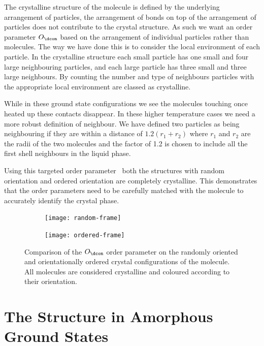 The crystalline structure of the \dcon molecule is defined by the underlying arrangement of particles, the arrangement of bonds on top of the arrangement of particles does not contribute to the crystal structure. As such we want an order parameter $O_\dcon$ based on the arrangement of individual particles rather than molecules. The way we have done this is to consider the local environment of each particle. In the crystalline structure each small particle has one small and four large neighbouring particles, and each large particle has three small and three large neighbours. By counting the number and type of neighbours particles with the appropriate local environment are classed as crystalline. 

While in these ground state configurations we see the molecules touching once heated up these contacts disappear. In these higher temperature cases we need a more robust definition of neighbour. We have defined two particles as being neighbouring if they are within a distance of $1.2(r_1 +r_2)$ where $r_1$ and $r_2$ are the radii of the two molecules and the factor of 1.2 is chosen to include all the first shell neighbours in the liquid phase.

Using this targeted order parameter~ both the structures with random orientation and ordered orientation are completely crystalline. This demonstrates that the order parameters need to be carefully matched with the molecule to accurately identify the crystal phase.

\begin{figure}
    \begin{subfigure}[t]{0.5\linewidth}
        \texttt{[image: random-frame]}
        \caption{}
        \label{fig:random frame}
    \end{subfigure}
    \begin{subfigure}[t]{0.5\linewidth}
        \texttt{[image: ordered-frame]}
        \caption{}
        \label{fig:ordered frame}
    \end{subfigure}
    \caption{Comparison of the $O_\dcon$ order parameter on the randomly oriented  and orientationally ordered  crystal configurations of the \dcon molecule. All molecules are considered crystalline and coloured according to their orientation.}
    \label{fig:compact frame}
\end{figure}

\section{The Structure in Amorphous Ground States}
\label{sec:order inherent}

